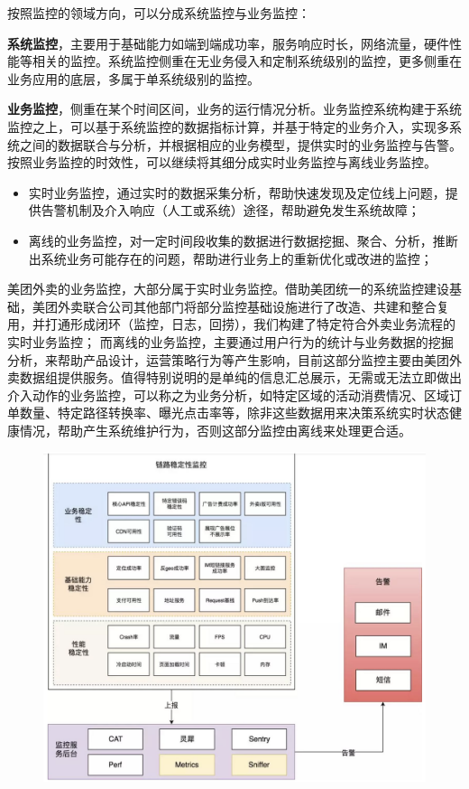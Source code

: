 \documentclass[12pt]{article}
\begin{document}
按照监控的领域方向，可以分成系统监控与业务监控：

\textbf{系统监控}，主要用于基础能力如端到端成功率，服务响应时长，网络流量，硬件性能等相关的监控。系统监控侧重在无业务侵入和定制系统级别的监控，更多侧重在业务应用的底层，多属于单系统级别的监控。

\textbf{业务监控}，侧重在某个时间区间，业务的运行情况分析。业务监控系统构建于系统监控之上，可以基于系统监控的数据指标计算，并基于特定的业务介入，实现多系统之间的数据联合与分析，并根据相应的业务模型，提供实时的业务监控与告警。按照业务监控的时效性，可以继续将其细分成实时业务监控与离线业务监控。

\begin{itemize}
\setlength{\itemsep}{0pt}
\setlength{\parsep}{0pt}
\setlength{\parskip}{0pt}
    \item 实时业务监控，通过实时的数据采集分析，帮助快速发现及定位线上问题，提供告警机制及介入响应（人工或系统）途径，帮助避免发生系统故障；
    \item 离线的业务监控，对一定时间段收集的数据进行数据挖掘、聚合、分析，推断出系统业务可能存在的问题，帮助进行业务上的重新优化或改进的监控；
\end{itemize}

美团外卖的业务监控，大部分属于实时业务监控。借助美团统一的系统监控建设基础，美团外卖联合公司其他部门将部分监控基础设施进行了改造、共建和整合复用，并打通形成闭环（监控，日志，回捞），我们构建了特定符合外卖业务流程的实时业务监控； 而离线的业务监控，主要通过用户行为的统计与业务数据的挖掘分析，来帮助产品设计，运营策略行为等产生影响，目前这部分监控主要由美团外卖数据组提供服务。值得特别说明的是单纯的信息汇总展示，无需或无法立即做出介入动作的业务监控，可以称之为业务分析，如特定区域的活动消费情况、区域订单数量、特定路径转换率、曝光点击率等，除非这些数据用来决策系统实时状态健康情况，帮助产生系统维护行为，否则这部分监控由离线来处理更合适。

\begin{figure}[H]
    \centering
    \includegraphics[width=1\textwidth]{fig/Meituan_APP_High_4.png}
\end{figure}
\end{document}

